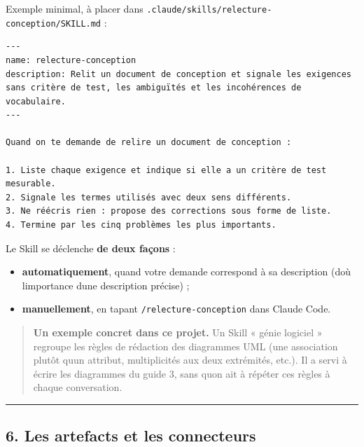 \documentclass[
  french,
  11pt,
  a4paper,
]{article}
\providecommand{\tightlist}{%
  \setlength{\itemsep}{0pt}\setlength{\parskip}{0pt}}
\begin{document}
Exemple minimal, à placer dans
\texttt{.\allowbreak{}claude/\allowbreak{}skills/\allowbreak{}relecture-\allowbreak{}conception/\allowbreak{}SKILL.\allowbreak{}md}
:

\begin{Verbatim}[breaklines=true,breakanywhere=true,fontsize=\small,frame=leftline,framerule=1.6pt,rulecolor=\color{credixblue},framesep=3mm,xleftmargin=2mm,xrightmargin=1mm]
---
name: relecture-conception
description: Relit un document de conception et signale les exigences sans critère de test, les ambiguïtés et les incohérences de vocabulaire.
---

Quand on te demande de relire un document de conception :

1. Liste chaque exigence et indique si elle a un critère de test mesurable.
2. Signale les termes utilisés avec deux sens différents.
3. Ne réécris rien : propose des corrections sous forme de liste.
4. Termine par les cinq problèmes les plus importants.
\end{Verbatim}

Le Skill se déclenche \textbf{de deux façons} :

\begin{itemize}
\tightlist
\item
  \textbf{automatiquement}, quand votre demande correspond à sa
  description (d\textquotesingle où l\textquotesingle importance
  d\textquotesingle une description précise) ;
\item
  \textbf{manuellement}, en tapant
  \texttt{/\allowbreak{}relecture-\allowbreak{}conception} dans Claude
  Code.
\end{itemize}

\begin{quote}
\textbf{Un exemple concret dans ce projet.} Un Skill « génie logiciel »
regroupe les règles de rédaction des diagrammes UML (une association
plutôt qu\textquotesingle un attribut, multiplicités aux deux
extrémités, etc.). Il a servi à écrire les diagrammes du guide 3, sans
qu\textquotesingle on ait à répéter ces règles à chaque conversation.
\end{quote}

\begin{center}\rule{0.5\linewidth}{0.5pt}\end{center}

\subsection{6. Les artefacts et les
connecteurs}\label{6-les-artefacts-et-les-connecteurs}
\end{document}
